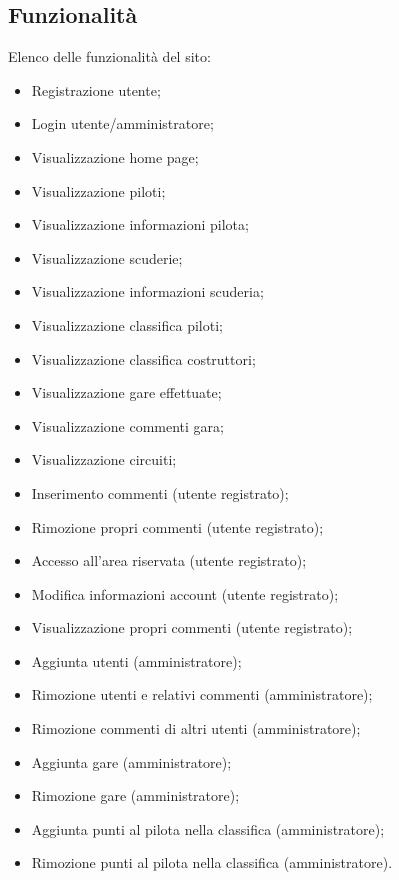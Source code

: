 \documentclass[11pt,a4paper]{article}
\begin{document}
\subsection{Funzionalità}
Elenco delle funzionalità del sito:
\begin{itemize}
    \item Registrazione utente;
    \item Login utente/amministratore;
    \item Visualizzazione home page;
    \item Visualizzazione piloti;
    \item Visualizzazione informazioni pilota;
    \item Visualizzazione scuderie;
    \item Visualizzazione informazioni scuderia;
    \item Visualizzazione classifica piloti;
    \item Visualizzazione classifica costruttori;
    \item Visualizzazione gare effettuate;
    \item Visualizzazione commenti gara;
    \item Visualizzazione circuiti;
    \item Inserimento commenti (utente registrato);
    \item Rimozione propri commenti (utente registrato);
    \item Accesso all'area riservata (utente registrato);
    \item Modifica informazioni account (utente registrato);
    \item Visualizzazione propri commenti (utente registrato);
    \item Aggiunta utenti (amministratore);
    \item Rimozione utenti e relativi commenti (amministratore);
    \item Rimozione commenti di altri utenti (amministratore);
    \item Aggiunta gare (amministratore);
    \item Rimozione gare (amministratore);
    \item Aggiunta punti al pilota nella classifica (amministratore);
    \item Rimozione punti al pilota nella classifica (amministratore).
\end{itemize}
\end{document}
